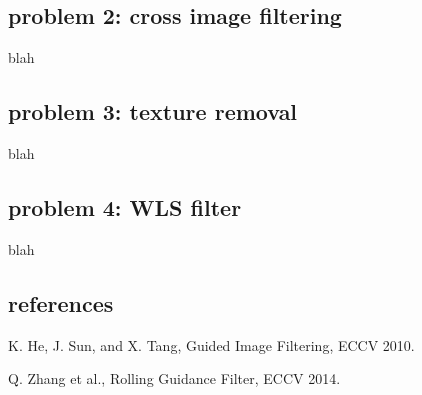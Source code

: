 \documentclass[extendedabs]{bmvc2k}
\begin{document}
\subsection*{problem 2: cross image filtering}

blah

\subsection*{problem 3: texture removal}

blah

\subsection*{problem 4: WLS filter}

blah

\subsection*{references}

\begin{thebibliography}{9}
    K. He, J. Sun, and X. Tang, Guided Image Filtering, ECCV 2010.
    
    Q. Zhang et al., Rolling Guidance Filter, ECCV 2014.
\end{thebibliography}
\end{document}
